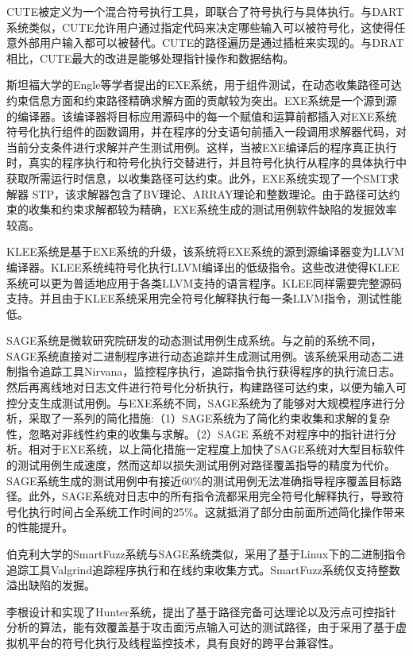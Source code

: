 CUTE被定义为一个混合符号执行工具，即联合了符号执行与具体执行。与DART系统类似，CUTE允许用户通过指定代码来决定哪些输入可以被符号化，这使得任意外部用户输入都可以被替代。CUTE的路径遍历是通过插桩来实现的。与DRAT相比，CUTE最大的改进是能够处理指针操作和数据结构。

斯坦福大学的Engle等学者提出的EXE系统，用于组件测试，在动态收集路径可达约束信息方面和约束路径精确求解方面的贡献较为突出。EXE系统是一个源到源的编译器。该编译器将目标应用源码中的每一个赋值和运算前都插入对EXE系统符号化执行组件的函数调用，并在程序的分支语句前插入一段调用求解器代码，对当前分支条件进行求解并产生测试用例。这样，当被EXE编译后的程序真正执行时，真实的程序执行和符号化执行交替进行，并且符号化执行从程序的具体执行中获取所需运行时信息，以收集路径可达约束。此外，EXE系统实现了一个SMT求解器 STP，该求解器包含了BV理论、ARRAY理论和整数理论。由于路径可达约束的收集和约束求解都较为精确，EXE系统生成的测试用例软件缺陷的发掘效率较高。

KLEE系统是基于EXE系统的升级，该系统将EXE系统的源到源编译器变为LLVM编译器。KLEE系统纯符号化执行LLVM编译出的低级指令。这些改进使得KLEE系统可以更为普适地应用于各类LLVM支持的语言程序。KLEE同样需要完整源码支持。并且由于KLEE系统采用完全符号化解释执行每一条LLVM指令，测试性能低。

SAGE系统是微软研究院研发的动态测试用例生成系统。与之前的系统不同，SAGE系统直接对二进制程序进行动态追踪并生成测试用例。该系统采用动态二进制指令追踪工具Nirvana，监控程序执行，追踪指令执行获得程序的执行流日志。然后再离线地对日志文件进行符号化分析执行，构建路径可达约束，以便为输入可控分支生成测试用例。与EXE系统不同，SAGE系统为了能够对大规模程序进行分析，采取了一系列的简化措施:（1）SAGE系统为了简化约束收集和求解的复杂性，忽略对非线性约束的收集与求解。（2）SAGE 系统不对程序中的指针进行分析。相对于EXE系统，以上简化措施一定程度上加快了SAGE系统对大型目标软件的测试用例生成速度，然而这却以损失测试用例对路径覆盖指导的精度为代价。SAGE系统生成的测试用例中有接近60\%的测试用例无法准确指导程序覆盖目标路径。此外，SAGE系统对日志中的所有指令流都采用完全符号化解释执行，导致符号化执行时间占全系统工作时间的25\%。这就抵消了部分由前面所述简化操作带来的性能提升。

伯克利大学的SmartFuzz系统与SAGE系统类似，采用了基于Linux下的二进制指令追踪工具Valgrind追踪程序执行和在线约束收集方式。SmartFuzz系统仅支持整数溢出缺陷的发掘。

李根设计和实现了Hunter系统，提出了基于路径完备可达理论以及污点可控指针分析的算法，能有效覆盖基于攻击面污点输入可达的测试路径，由于采用了基于虚拟机平台的符号化执行及线程监控技术，具有良好的跨平台兼容性。

